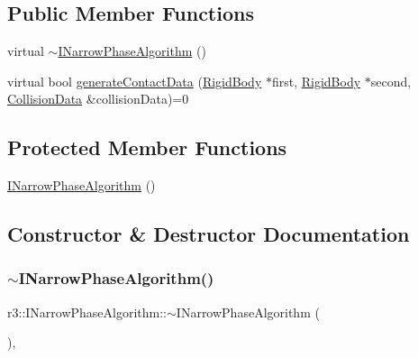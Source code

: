 \subsection*{Public Member Functions}
\begin{DoxyCompactItemize}
\item 
virtual \mbox{\hyperlink{classr3_1_1_i_narrow_phase_algorithm_a5c60462a72d97075b147bc4f0392b4f8}{$\sim$\+I\+Narrow\+Phase\+Algorithm}} ()
\item 
virtual bool \mbox{\hyperlink{classr3_1_1_i_narrow_phase_algorithm_a606fe8de5fe81ff45fedb81ca74717c3}{generate\+Contact\+Data}} (\mbox{\hyperlink{classr3_1_1_rigid_body}{Rigid\+Body}} $\ast$first, \mbox{\hyperlink{classr3_1_1_rigid_body}{Rigid\+Body}} $\ast$second, \mbox{\hyperlink{classr3_1_1_collision_data}{Collision\+Data}} \&collision\+Data)=0
\end{DoxyCompactItemize}
\subsection*{Protected Member Functions}
\begin{DoxyCompactItemize}
\item 
\mbox{\hyperlink{classr3_1_1_i_narrow_phase_algorithm_a870b838f5095825c1033a195f1e5d7e0}{I\+Narrow\+Phase\+Algorithm}} ()
\end{DoxyCompactItemize}


\subsection{Constructor \& Destructor Documentation}
\mbox{\label{classr3_1_1_i_narrow_phase_algorithm_a5c60462a72d97075b147bc4f0392b4f8}} 
\subsubsection{\texorpdfstring{$\sim$\+I\+Narrow\+Phase\+Algorithm()}{~INarrowPhaseAlgorithm()}}
{\footnotesize\ttfamily r3\+::\+I\+Narrow\+Phase\+Algorithm\+::$\sim$\+I\+Narrow\+Phase\+Algorithm (\begin{DoxyParamCaption}{ }\end{DoxyParamCaption})\hspace{0.3cm}{\ttfamily [virtual]}, {\ttfamily [default]}}

